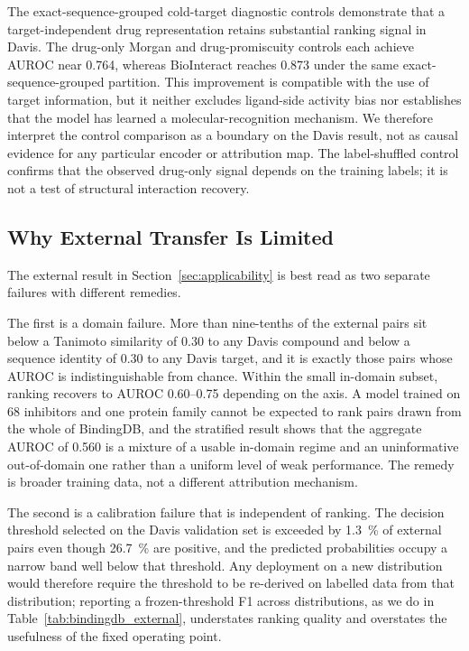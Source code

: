 \documentclass[fleqn,10pt]{wlscirep}
\begin{document}
The exact-sequence-grouped cold-target diagnostic controls demonstrate that a target-independent
drug representation retains substantial ranking signal in Davis.  The
drug-only Morgan and drug-promiscuity controls each achieve AUROC near 0.764,
whereas BioInteract reaches 0.873 under the same exact-sequence-grouped
partition.  This improvement is compatible with the use of target information,
but it neither excludes ligand-side activity bias nor establishes that the model
has learned a molecular-recognition mechanism.  We therefore interpret the
control comparison as a boundary on the Davis result, not as causal evidence for
any particular encoder or attribution map.  The label-shuffled control confirms
that the observed drug-only signal depends on the training labels; it is not a
test of structural interaction recovery.

\begingroup\color{red}
\subsection{Why External Transfer Is Limited}
\label{sec:transfer}

The external result in Section~\ref{sec:applicability} is best read as two
separate failures with different remedies.

The first is a domain failure.  More than nine-tenths of the external pairs sit
below a Tanimoto similarity of 0.30 to any Davis compound and below a sequence
identity of 0.30 to any Davis target, and it is exactly those pairs whose AUROC
is indistinguishable from chance.  Within the small in-domain subset, ranking
recovers to AUROC 0.60--0.75 depending on the axis.  A model trained on 68
inhibitors and one protein family cannot be expected to rank pairs drawn from
the whole of BindingDB, and the stratified result shows that the aggregate
AUROC of 0.560 is a mixture of a usable in-domain regime and an uninformative
out-of-domain one rather than a uniform level of weak performance.  The remedy
is broader training data, not a different attribution mechanism.

The second is a calibration failure that is independent of ranking.  The
decision threshold selected on the Davis validation set is exceeded by
\SI{1.3}{\percent} of external pairs even though \SI{26.7}{\percent} are
positive, and the predicted probabilities occupy a narrow band well below that
threshold.  Any deployment on a new distribution would therefore require the
threshold to be re-derived on labelled data from that distribution; reporting a
frozen-threshold F1 across distributions, as we do in
Table~\ref{tab:bindingdb_external}, understates ranking quality and overstates
the usefulness of the fixed operating point.
\end{document}
